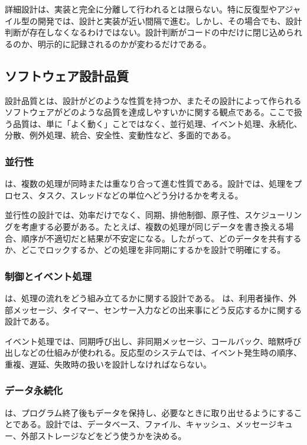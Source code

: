 \documentclass[a4paper,11pt]{ltjsarticle}
\numberwithin{figure}{section}
\numberwithin{table}{section}
\begin{document}
詳細設計は、実装と完全に分離して行われるとは限らない。特に反復型やアジャイル型の開発では、設計と実装が近い間隔で進む。しかし、その場合でも、設計判断が存在しなくなるわけではない。設計判断がコードの中だけに閉じ込められるのか、明示的に記録されるのかが変わるだけである。

\subsection{ソフトウェア設計品質}

設計品質とは、設計がどのような性質を持つか、またその設計によって作られるソフトウェアがどのような品質を達成しやすいかに関する観点である。ここで扱う品質は、単に「よく動く」ことではなく、並行処理、イベント処理、永続化、分散、例外処理、統合、安全性、変動性など、多面的である。

\subsubsection{並行性}

 は、複数の処理が同時または重なり合って進む性質である。設計では、処理をプロセス、タスク、スレッドなどの単位へどう分けるかを考える。

並行性の設計では、効率だけでなく、同期、排他制御、原子性、スケジューリングを考慮する必要がある。たとえば、複数の処理が同じデータを書き換える場合、順序が不適切だと結果が不安定になる。したがって、どのデータを共有するか、どこでロックするか、どの処理を非同期にするかを設計で明確にする。

\subsubsection{制御とイベント処理}

 は、処理の流れをどう組み立てるかに関する設計である。 は、利用者操作、外部メッセージ、タイマー、センサー入力などの出来事にどう反応するかに関する設計である。

イベント処理では、同期呼び出し、非同期メッセージ、コールバック、暗黙呼び出しなどの仕組みが使われる。反応型のシステムでは、イベント発生時の順序、重複、遅延、失敗時の扱いを設計しなければならない。

\subsubsection{データ永続化}

 は、プログラム終了後もデータを保持し、必要なときに取り出せるようにすることである。設計では、データベース、ファイル、キャッシュ、メッセージキュー、外部ストレージなどをどう使うかを決める。
\end{document}

